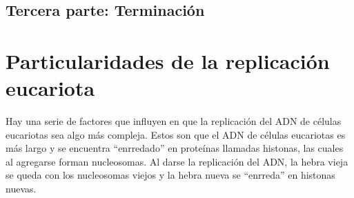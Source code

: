 \subsection{Tercera parte: Terminación}



\section{Particularidades de la replicación eucariota}

Hay una serie de factores que influyen en que la replicación del ADN de células eucariotas sea algo más compleja. Estos son que el ADN de células eucariotas es más largo y se encuentra ``enrredado'' en proteínas llamadas histonas, las cuales al agregarse forman nucleosomas. Al darse la replicación del ADN, la hebra vieja se queda con los nucleosomas viejos y la hebra nueva se ``enrreda'' en histonas nuevas.


